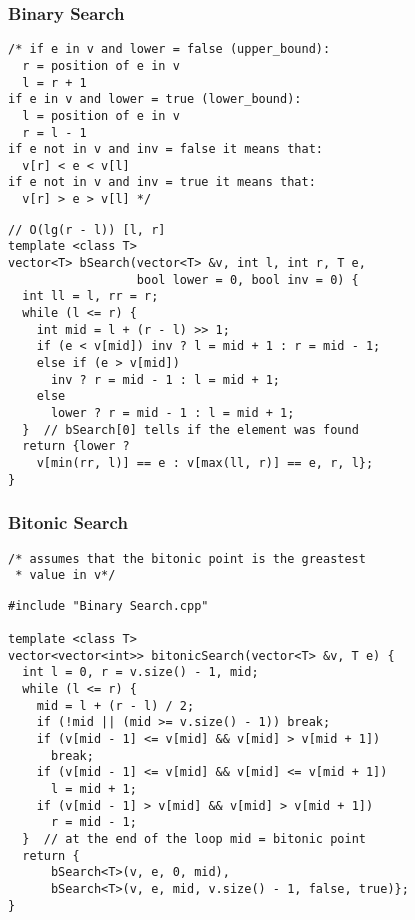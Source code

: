 \documentclass[twoside]{article}
\newcommand{\fileTitleStyle}{\large\underline}
\begin{document}
\begin{multicols*}{2}
\subsubsection*{Binary Search}
\begin{verbatim}
/* if e in v and lower = false (upper_bound):
  r = position of e in v
  l = r + 1
if e in v and lower = true (lower_bound):
  l = position of e in v
  r = l - 1
if e not in v and inv = false it means that:
  v[r] < e < v[l]
if e not in v and inv = true it means that:
  v[r] > e > v[l] */
\end{verbatim}
\vspace{-12pt}
\begin{verbatim}
// O(lg(r - l)) [l, r]
template <class T>
vector<T> bSearch(vector<T> &v, int l, int r, T e,
                  bool lower = 0, bool inv = 0) {
  int ll = l, rr = r;
  while (l <= r) {
    int mid = l + (r - l) >> 1;
    if (e < v[mid]) inv ? l = mid + 1 : r = mid - 1;
    else if (e > v[mid])
      inv ? r = mid - 1 : l = mid + 1;
    else
      lower ? r = mid - 1 : l = mid + 1;
  }  // bSearch[0] tells if the element was found
  return {lower ?
    v[min(rr, l)] == e : v[max(ll, r)] == e, r, l};
}
\end{verbatim}

\subsubsectionfont{\centering\bfseries\Large}
\subsubsectionfont{\fileTitleStyle}
\subsubsection*{Bitonic Search}
\begin{verbatim}
/* assumes that the bitonic point is the greastest
 * value in v*/

\end{verbatim}
\vspace{-12pt}
\begin{verbatim}
#include "Binary Search.cpp"

template <class T>
vector<vector<int>> bitonicSearch(vector<T> &v, T e) {
  int l = 0, r = v.size() - 1, mid;
  while (l <= r) {
    mid = l + (r - l) / 2;
    if (!mid || (mid >= v.size() - 1)) break;
    if (v[mid - 1] <= v[mid] && v[mid] > v[mid + 1])
      break;
    if (v[mid - 1] <= v[mid] && v[mid] <= v[mid + 1])
      l = mid + 1;
    if (v[mid - 1] > v[mid] && v[mid] > v[mid + 1])
      r = mid - 1;
  }  // at the end of the loop mid = bitonic point
  return {
      bSearch<T>(v, e, 0, mid),
      bSearch<T>(v, e, mid, v.size() - 1, false, true)};
}
\end{verbatim}


\end{multicols*}
\end{document}
